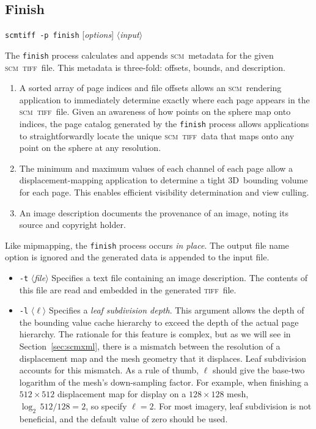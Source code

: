 \documentclass[oneside,10pt]{memoir}
\newcommand{\threed}  {3D}
\newcommand{\scm}     {\textsc{scm}}
\newcommand{\tiff}    {\textsc{tiff}}
\newcommand{\scmtiff} {\texttt{scmtiff}}
\newcommand{\inangles}[1]{$\langle$#1$\rangle$}
\newenvironment{optionlist}
  {\setlength{\leftmargini}{1in}\begin{itemize}}{\end{itemize}}
\begin{document}
\begin{Spacing}{1.1}
\subsection{Finish}

\noindent\scmtiff\ \texttt{-p finish} [\textit{options}] \inangles{\textit{input}}

\bigskip The \texttt{finish} process calculates and appends \scm\ metadata for the given \scm\ \tiff\ file. This metadata is three-fold: offsets, bounds, and description.

\begin{enumerate}
\item A sorted array of page indices and file offsets allows an \scm\ rendering application to immediately determine exactly where each page appears in the \scm\ \tiff\ file. Given an awareness of how points on the sphere map onto indices, the page catalog generated by the \texttt{finish} process allows applications to straightforwardly locate the unique \scm\ \tiff\ data that maps onto any point on the sphere at any resolution.

\item The minimum and maximum values of each channel of each page allow a displacement-mapping application to determine a tight \threed\ bounding volume for each page. This enables efficient visibility determination and view culling.

\item An image description documents the provenance of an image, noting its source and copyright holder.
\end{enumerate}

Like mipmapping, the \texttt{finish} process occurs \emph{in place}. The output file name option is ignored and the generated data is appended to the input file.

\begin{optionlist}
\item[\texttt{-t} \inangles{\textit{file}}] Specifies a text file containing an image description. The contents of this file are read and embedded in the generated \tiff\ file.

\item[\texttt{-l} \inangles{$\ell$}] Specifies a \emph{leaf subdivision depth}. This argument allows the depth of the bounding value cache hierarchy to exceed the depth of the actual page hierarchy. The rationale for this feature is complex, but as we will see in Section~\ref{sec:scmxml}, there is a mismatch between the resolution of a displacement map and the mesh geometry that it displaces. Leaf subdivision accounts for this mismatch. As a rule of thumb, $\ell$ should give the base-two logarithm of the mesh's down-sampling factor. For example, when finishing a $512\times 512$ displacement map for display on a $128\times 128$ mesh, $\log_2\, 512 / 128=2$, so specify $\ell=2$. For most imagery, leaf subdivision is not beneficial, and the default value of zero should be used.
\end{optionlist}


\end{Spacing}
\end{document}
